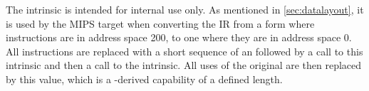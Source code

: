 The  intrinsic is intended for internal use only.
As mentioned in \autoref{sec:datalayout}, it is used by the MIPS target when converting the IR from a form where  instructions are in address space 200, to one where they are in address space 0.
All  instructions are replaced with a short sequence of an  followed by a call to this intrinsic and then a call to the  intrinsic.
All uses of the original  are then replaced by this value, which is a -derived capability of a defined length.


